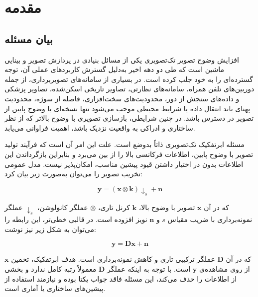 
\thispagestyle{empty}

\chapter{مقدمه}

\section{بیان مسئله}

افزایش وضوح تصویر تک‌تصویری یکی از مسائل بنیادی در پردازش تصویر و بینایی ماشین است که طی دو دهه اخیر به‌دلیل گسترش کاربردهای عملی آن، توجه گسترده‌ای را به خود جلب کرده است. در بسیاری از سامانه‌های تصویربرداری، از جمله دوربین‌های تلفن همراه، سامانه‌های نظارتی، تصاویر تاریخی اسکن‌شده، تصاویر پزشکی و داده‌های سنجش از دور، محدودیت‌های سخت‌افزاری، فاصله از سوژه، محدودیت پهنای باند انتقال داده یا شرایط محیطی موجب می‌شود تنها نسخه‌ای با وضوح پایین از تصویر در دسترس باشد. در چنین شرایطی، بازسازی تصویری با وضوح بالاتر که از نظر ساختاری و ادراکی به واقعیت نزدیک باشد، اهمیت فراوانی می‌یابد.

مسئله ابرتفکیک تک‌تصویری ذاتاً بدوضع است. علت این امر آن است که فرآیند تولید تصویر با وضوح پایین، اطلاعات فرکانسی بالا را از بین می‌برد و بنابراین بازگرداندن این اطلاعات بدون در اختیار داشتن قیود پیشین مناسب، امکان‌پذیر نیست. مدل عمومی تخریب تصویر را می‌توان به‌صورت زیر بیان کرد:

\begin{equation}
	\mathbf{y} = (\mathbf{x} \otimes \mathbf{k}) \downarrow_s + \mathbf{n}
\end{equation}

که در آن $\mathbf{x}$ تصویر با وضوح بالا، $\mathbf{k}$ کرنل تاری، $\otimes$ عملگر کانولوشن، $\downarrow_s$ عملگر نمونه‌برداری با ضریب مقیاس $s$ و $\mathbf{n}$ نویز افزوده است. در قالبی خطی‌تر، این رابطه را می‌توان به شکل زیر نیز نوشت:

\begin{equation}
	\mathbf{y} = \mathbf{D}\mathbf{x} + \mathbf{n}
\end{equation}

که در آن $\mathbf{D}$ عملگر ترکیبی تاری و کاهش نمونه‌برداری است. هدف ابرتفکیک، تخمین $\mathbf{x}$ از روی مشاهده‌ی $\mathbf{y}$ است. با توجه به اینکه عملگر $\mathbf{D}$ معمولاً رتبه کامل ندارد و بخشی از اطلاعات را حذف می‌کند، این مسئله فاقد جواب یکتا بوده و نیازمند استفاده از پیشین‌های ساختاری یا آماری است.


